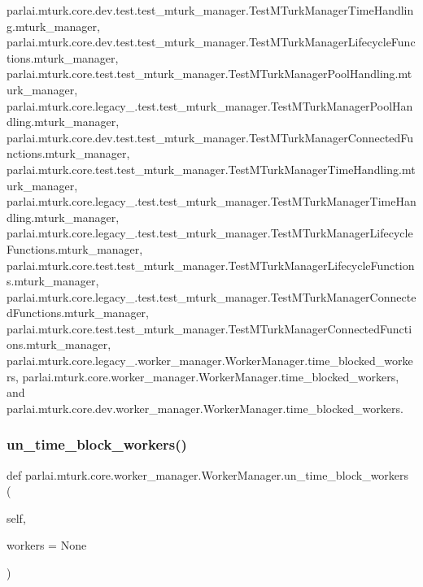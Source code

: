 parlai.\+mturk.\+core.\+dev.\+test.\+test\+\_\+mturk\+\_\+manager.\+Test\+M\+Turk\+Manager\+Time\+Handling.\+mturk\+\_\+manager, parlai.\+mturk.\+core.\+dev.\+test.\+test\+\_\+mturk\+\_\+manager.\+Test\+M\+Turk\+Manager\+Lifecycle\+Functions.\+mturk\+\_\+manager, parlai.\+mturk.\+core.\+test.\+test\+\_\+mturk\+\_\+manager.\+Test\+M\+Turk\+Manager\+Pool\+Handling.\+mturk\+\_\+manager, parlai.\+mturk.\+core.\+legacy\+\_.\+test.\+test\+\_\+mturk\+\_\+manager.\+Test\+M\+Turk\+Manager\+Pool\+Handling.\+mturk\+\_\+manager, parlai.\+mturk.\+core.\+dev.\+test.\+test\+\_\+mturk\+\_\+manager.\+Test\+M\+Turk\+Manager\+Connected\+Functions.\+mturk\+\_\+manager, parlai.\+mturk.\+core.\+test.\+test\+\_\+mturk\+\_\+manager.\+Test\+M\+Turk\+Manager\+Time\+Handling.\+mturk\+\_\+manager, parlai.\+mturk.\+core.\+legacy\+\_.\+test.\+test\+\_\+mturk\+\_\+manager.\+Test\+M\+Turk\+Manager\+Time\+Handling.\+mturk\+\_\+manager, parlai.\+mturk.\+core.\+legacy\+\_.\+test.\+test\+\_\+mturk\+\_\+manager.\+Test\+M\+Turk\+Manager\+Lifecycle\+Functions.\+mturk\+\_\+manager, parlai.\+mturk.\+core.\+test.\+test\+\_\+mturk\+\_\+manager.\+Test\+M\+Turk\+Manager\+Lifecycle\+Functions.\+mturk\+\_\+manager, parlai.\+mturk.\+core.\+legacy\+\_.\+test.\+test\+\_\+mturk\+\_\+manager.\+Test\+M\+Turk\+Manager\+Connected\+Functions.\+mturk\+\_\+manager, parlai.\+mturk.\+core.\+test.\+test\+\_\+mturk\+\_\+manager.\+Test\+M\+Turk\+Manager\+Connected\+Functions.\+mturk\+\_\+manager, parlai.\+mturk.\+core.\+legacy\+\_.\+worker\+\_\+manager.\+Worker\+Manager.\+time\+\_\+blocked\+\_\+workers, parlai.\+mturk.\+core.\+worker\+\_\+manager.\+Worker\+Manager.\+time\+\_\+blocked\+\_\+workers, and parlai.\+mturk.\+core.\+dev.\+worker\+\_\+manager.\+Worker\+Manager.\+time\+\_\+blocked\+\_\+workers.

\mbox{\label{classparlai_1_1mturk_1_1core_1_1worker__manager_1_1WorkerManager_af4c5d947d5477e2b5a7bd6167e125ba9}} 
\subsubsection{\texorpdfstring{un\+\_\+time\+\_\+block\+\_\+workers()}{un\_time\_block\_workers()}}
{\footnotesize\ttfamily def parlai.\+mturk.\+core.\+worker\+\_\+manager.\+Worker\+Manager.\+un\+\_\+time\+\_\+block\+\_\+workers (\begin{DoxyParamCaption}\item[{}]{self,  }\item[{}]{workers = {\ttfamily None} }\end{DoxyParamCaption})}



